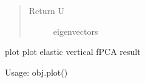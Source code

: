 \documentclass[letterpaper,10pt,english]{sphinxmanual}
\begin{document}
\begin{fulllineitems}
\begin{fulllineitems}
\begin{quote}
\begin{description}
\item[{Return U}] \leavevmode
eigenvectors

\end{description}\end{quote}

\end{fulllineitems}


\begin{fulllineitems}
\label{\detokenize{fPCA:fPCA.fdajpca.plot}}
plot plot elastic vertical fPCA result

Usage: obj.plot()

\end{fulllineitems}


\end{fulllineitems}

\end{document}
